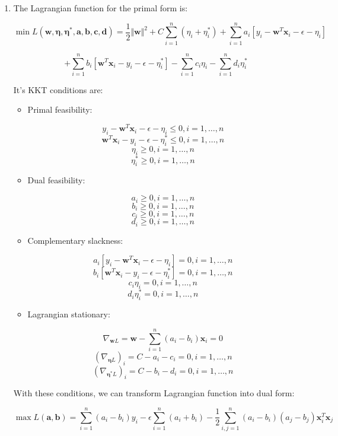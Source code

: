 \documentclass[paper=letter, fontsize=12pt]{article}
\begin{document}
\begin{enumerate}[label=(\alph*)]
	\item
	The Lagrangian function for the primal form is:
	
	$$
	\min L(\mathbf{w}, \mathbf{\eta}, \mathbf{\eta^*}, \mathbf{a}, \mathbf{b}, \mathbf{c}, \mathbf{d}) = \frac{1}{2} \Vert \mathbf{w} \Vert^2 + C \sum_{i = 1}^{n} (\eta_i + \eta_i^*) + \sum_{i = 1}^{n} a_i [y_i - \mathbf{w}^T \mathbf{x}_i - \epsilon - \eta_i]
	$$
	
	$$
	+ \sum_{i = 1}^{n} b_i[\mathbf{w}^T \mathbf{x}_i - y_i - \epsilon - \eta_i^*] - \sum_{i = 1}^{n} c_i \eta_i - \sum_{i = 1}^{n} d_i \eta_i^*
	$$
	
	It's KKT conditions are:
	
	\begin{itemize}
		\item Primal feasibility: 
		
		$$y_i - \mathbf{w}^T \mathbf{x}_i - \epsilon - \eta_i \leq 0, i = 1, \dots, n$$
		$$\mathbf{w}^T \mathbf{x}_i  - y_i - \epsilon - \eta_i^* \leq 0, i = 1, \dots, n$$
		$$\eta_i \geq 0, i = 1, \dots, n$$
		$$\eta_i^* \geq 0, i = 1, \dots, n$$ 
		
		\item Dual feasibility:
		
		$$a_i \geq 0, i = 1, \dots, n$$
		$$b_i \geq 0, i = 1, \dots, n$$
		$$c_i \geq 0, i = 1, \dots, n$$
		$$d_i \geq 0, i = 1, \dots, n$$
		
		\item Complementary slackness:
		
		$$a_i [y_i - \mathbf{w}^T \mathbf{x}_i - \epsilon - \eta_i] = 0,  i = 1, \dots, n$$
		$$b_i [\mathbf{w}^T \mathbf{x}_i  - y_i - \epsilon - \eta_i^*] = 0,  i = 1, \dots, n$$
		$$c_i \eta_i = 0,  i = 1, \dots, n$$
		$$d_i \eta_i^* = 0,  i = 1, \dots, n$$
		
		\item Lagrangian stationary:
		
		$$\nabla_{\mathbf{w} L} = \mathbf{w} - \sum_{i = 1}^{n} (a_i - b_i) \mathbf{x}_i = 0$$
		$$(\nabla_{\mathbf{\eta} L})_{i} = C - a_i - c_i = 0, i = 1, \dots, n$$
		$$(\nabla_{\mathbf{\eta^*} L})_{i} = C - b_i - d_i = 0, i = 1, \dots, n$$

	\end{itemize} 

	With these conditions, we can transform Lagrangian function into dual form:
	
	$$
	\max L(\mathbf{a}, \mathbf{b}) = \sum_{i = 1}^{n} (a_i - b_i) y_i - \epsilon \sum_{i = 1}^{n} (a_i + b_i) - \frac{1}{2} \sum_{i, j = 1}^{n} (a_i - b_i) (a_j - b_j) \mathbf{x}_i^T \mathbf{x}_j
	$$
	

\end{enumerate}
\end{document}
